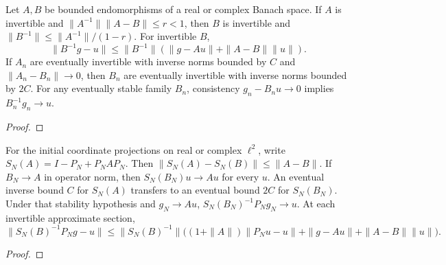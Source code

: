 \begin{supporting}
\begin{theorem}
\label{thm:norm-operator-perturbation}
\leanok
Let $A,B$ be bounded endomorphisms of a real or complex Banach space.
If $A$ is invertible and $\|A^{-1}\|\|A-B\|\le r<1$, then $B$ is invertible and
$\|B^{-1}\|\le\|A^{-1}\|/(1-r)$.
For invertible $B$,
\[
 \|B^{-1}g-u\|\le\|B^{-1}\|
 (\|g-Au\|+\|A-B\|\|u\|).
\]
If $A_n$ are eventually invertible with inverse norms bounded by $C$ and
$\|A_n-B_n\|\to0$, then $B_n$ are eventually invertible with inverse norms
bounded by $2C$. For any eventually stable family $B_n$, consistency
$g_n-B_nu\to0$ implies $B_n^{-1}g_n\to u$.
\end{theorem}
\begin{proof}
\leanok
\end{proof}

\begin{theorem}
\label{thm:approximate-coercive-sections}
\leanok
For the initial coordinate projections on real or complex $\ell^2$, write
$S_N(A)=I-P_N+P_NAP_N$. Then
$\|S_N(A)-S_N(B)\|\le\|A-B\|$.
If $B_N\to A$ in operator norm, then $S_N(B_N)u\to Au$ for every $u$.
An eventual inverse bound $C$ for $S_N(A)$ transfers to an eventual bound
$2C$ for $S_N(B_N)$. Under that stability hypothesis and $g_N\to Au$,
$S_N(B_N)^{-1}P_Ng_N\to u$.
At each invertible approximate section,
\[
 \|S_N(B)^{-1}P_Ng-u\|
 \le\|S_N(B)^{-1}\|
 \big((1+\|A\|)\|P_Nu-u\|+\|g-Au\|+\|A-B\|\|u\|\big).
\]
\end{theorem}
\begin{proof}
\leanok
\end{proof}


\end{supporting}
